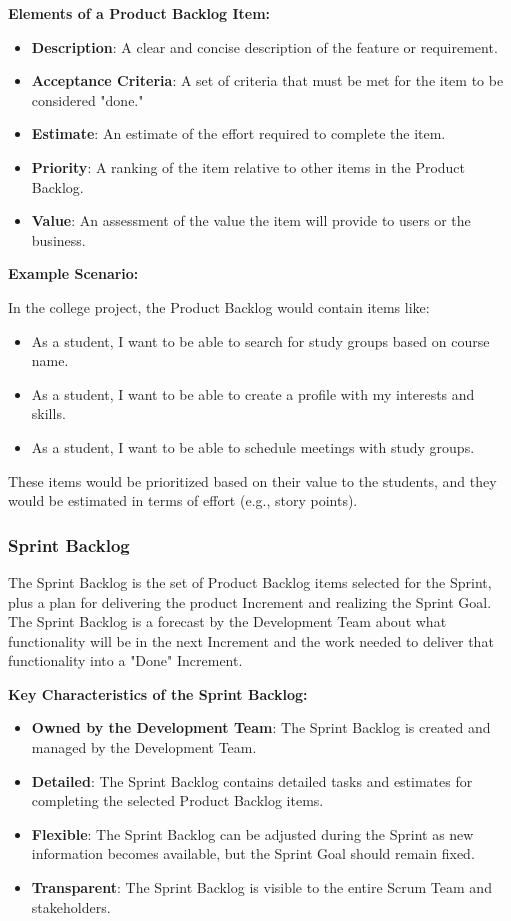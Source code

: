 \textbf{Elements of a Product Backlog Item:}

\begin{itemize}
  \item \textbf{Description}: A clear and concise description of the feature or requirement.
  \item \textbf{Acceptance Criteria}: A set of criteria that must be met for the item to be considered "done."
  \item \textbf{Estimate}: An estimate of the effort required to complete the item.
  \item \textbf{Priority}: A ranking of the item relative to other items in the Product Backlog.
  \item \textbf{Value}: An assessment of the value the item will provide to users or the business.
\end{itemize}

\textbf{Example Scenario:}

In the college project, the Product Backlog would contain items like:

\begin{itemize}
  \item As a student, I want to be able to search for study groups based on course
        name.
  \item As a student, I want to be able to create a profile with my interests and
        skills.
  \item As a student, I want to be able to schedule meetings with study groups.
\end{itemize}

These items would be prioritized based on their value to the students, and they
would be estimated in terms of effort (e.g., story points).

\subsubsection{Sprint Backlog}

The Sprint Backlog is the set of Product Backlog items selected for the Sprint,
plus a plan for delivering the product Increment and realizing the Sprint Goal.
The Sprint Backlog is a forecast by the Development Team about what
functionality will be in the next Increment and the work needed to deliver that
functionality into a "Done" Increment.

\textbf{Key Characteristics of the Sprint Backlog:}

\begin{itemize}
  \item \textbf{Owned by the Development Team}: The Sprint Backlog is created and managed by the Development Team.
  \item \textbf{Detailed}: The Sprint Backlog contains detailed tasks and estimates for completing the selected Product Backlog items.
  \item \textbf{Flexible}: The Sprint Backlog can be adjusted during the Sprint as new information becomes available, but the Sprint Goal should remain fixed.
  \item \textbf{Transparent}: The Sprint Backlog is visible to the entire Scrum Team and stakeholders.
\end{itemize}

